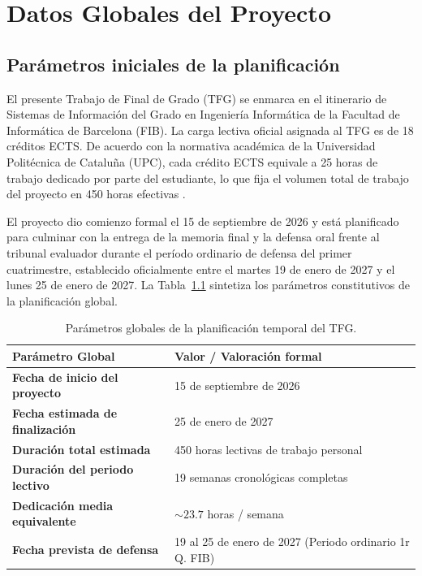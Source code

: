 \documentclass[12pt, a4paper, twoside]{report}
\begin{document}
\clearpage
{}

\tableofcontents %
\newpage
\listoftables    %
\newpage
\listoffigures   %

\clearpage
{}


\chapter{Datos Globales del Proyecto}

\section{Parámetros iniciales de la planificación}
El presente Trabajo de Final de Grado (TFG) se enmarca en el itinerario de Sistemas de Información del Grado en Ingeniería Informática de la Facultad de Informática de Barcelona (FIB). La carga lectiva oficial asignada al TFG es de 18 créditos ECTS. De acuerdo con la normativa académica de la Universidad Politécnica de Cataluña (UPC), cada crédito ECTS equivale a 25 horas de trabajo dedicado por parte del estudiante, lo que fija el volumen total de trabajo del proyecto en 450 horas efectivas \cite{ieee1058}.

El proyecto dio comienzo formal el 15 de septiembre de 2026 y está planificado para culminar con la entrega de la memoria final y la defensa oral frente al tribunal evaluador durante el período ordinario de defensa del primer cuatrimestre, establecido oficialmente entre el martes 19 de enero de 2027 y el lunes 25 de enero de 2027. La Tabla~\ref{tab:datos_globales} sintetiza los parámetros constitutivos de la planificación global.

\begin{table}[H]
\centering
\caption{Parámetros globales de la planificación temporal del TFG.}
\label{tab:datos_globales}
\small
\begin{tabularx}{\textwidth}{@{} p{5.8cm} X @{}}
\toprule
\textbf{Parámetro Global} & \textbf{Valor / Valoración formal} \\ \midrule
\textbf{Fecha de inicio del proyecto} & 15 de septiembre de 2026 \\ \addlinespace
\textbf{Fecha estimada de finalización} & 25 de enero de 2027 \\ \addlinespace
\textbf{Duración total estimada} & 450 horas lectivas de trabajo personal \\ \addlinespace
\textbf{Duración del periodo lectivo} & 19 semanas cronológicas completas \\ \addlinespace
\textbf{Dedicación media equivalente} & $\sim 23.7$ horas / semana \\ \addlinespace
\textbf{Fecha prevista de defensa} & 19 al 25 de enero de 2027 (Periodo ordinario 1r Q. FIB) \\ \bottomrule
\end{tabularx}
\end{table}
\end{document}
